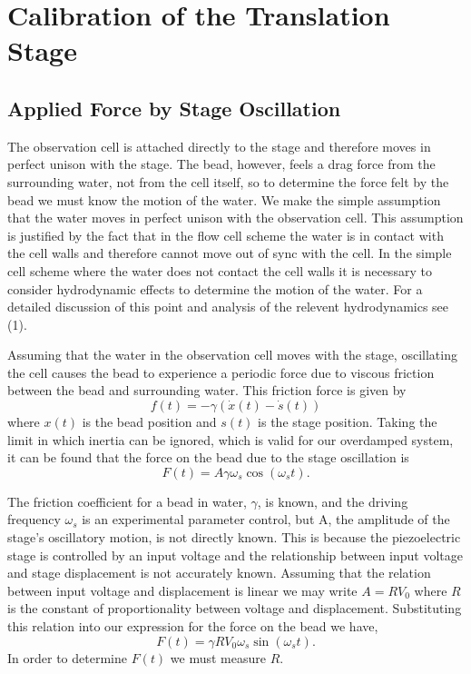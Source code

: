 \documentclass{report}
\begin{document}
\chapter{Calibration of the Translation Stage}

\section{Applied Force by Stage Oscillation}

The observation cell is attached directly to the stage and therefore moves in perfect unison with the stage. The bead, however, feels a drag force from the surrounding water, not from the cell itself, so to determine the force felt by the bead we must know the motion of the water. We make the simple assumption that the water moves in perfect unison with the observation cell. This assumption is justified by the fact that in the flow cell scheme the water is in contact with the cell walls and therefore cannot move out of sync with the cell. In the simple cell scheme where the water does not contact the cell walls it is necessary to consider hydrodynamic effects to determine the motion of the water. For a detailed discussion of this point and analysis of the relevent hydrodynamics see (1).

Assuming that the water in the observation cell moves with the stage, oscillating the cell causes the bead to experience a periodic force due to viscous friction between the bead and surrounding water. This friction force is given by
\begin{displaymath}
f(t) = -\gamma (\dot{x}(t) - \dot{s}(t))
\end{displaymath}
where $x(t)$ is the bead position and $s(t)$ is the stage position. Taking the limit in which inertia can be ignored, which is valid for our overdamped system, it can be found that the force on the bead due to the stage oscillation is
\begin{displaymath}
F(t) = A \gamma \omega_s \cos(\omega_s t).
\end{displaymath}

The friction coefficient for a bead in water, $\gamma$, is known, and the driving frequency $\omega_s$ is an experimental parameter control, but A, the amplitude of the stage's oscillatory motion, is not directly known.  This is because the piezoelectric stage is controlled by an input voltage and the relationship between input voltage and stage displacement is not accurately known. Assuming that the relation between input voltage and displacement is linear we may write $A = R V_0$ where $R$ is the constant of proportionality between voltage and displacement.  Substituting this relation into our expression for the force on the bead we have,
\begin{displaymath}
F(t) = \gamma R V_0 \omega_s \sin(\omega_s t).
\end{displaymath}
In order to determine $F(t)$ we must measure $R$.
\end{document}
